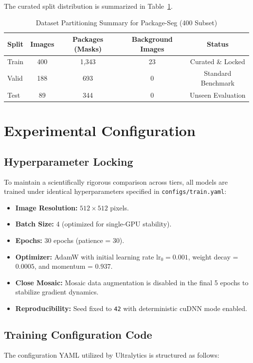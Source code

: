 \documentclass[conference]{IEEEtran}
\begin{document}
The curated split distribution is summarized in Table~\ref{tab:dataset_summary}.

\begin{table}[htbp]
\caption{Dataset Partitioning Summary for Package-Seg (400 Subset)}
\label{tab:dataset_summary}
\centering
\begin{tabular}{@{}lcccc@{}}
\toprule
\textbf{Split} & \textbf{Images} & \textbf{Packages (Masks)} & \textbf{Background Images} & \textbf{Status} \\ \midrule
Train & 400 & 1,343 & 23 & Curated \& Locked \\
Valid & 188 & 693 & 0 & Standard Benchmark \\
Test  & 89  & 344 & 0 & Unseen Evaluation \\ \bottomrule
\end{tabular}
\end{table}

\section{Experimental Configuration}
\subsection{Hyperparameter Locking}
To maintain a scientifically rigorous comparison across tiers, all models are trained under identical hyperparameters specified in \texttt{configs/train.yaml}:
\begin{itemize}
    \item \textbf{Image Resolution:} $512 \times 512$ pixels.
    \item \textbf{Batch Size:} 4 (optimized for single-GPU stability).
    \item \textbf{Epochs:} 30 epochs (patience = 30).
    \item \textbf{Optimizer:} AdamW with initial learning rate $\text{lr}_0 = 0.001$, weight decay = $0.0005$, and momentum = $0.937$.
    \item \textbf{Close Mosaic:} Mosaic data augmentation is disabled in the final 5 epochs to stabilize gradient dynamics.
    \item \textbf{Reproducibility:} Seed fixed to \texttt{42} with deterministic cuDNN mode enabled.
\end{itemize}

\subsection{Training Configuration Code}
The configuration YAML utilized by Ultralytics is structured as follows:
\end{document}
